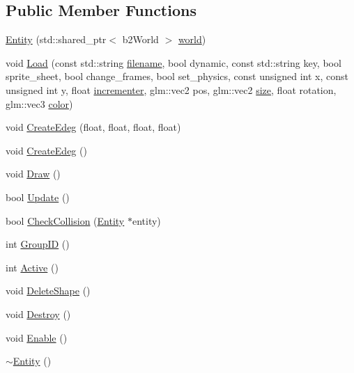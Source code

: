 \subsection*{Public Member Functions}
\begin{DoxyCompactItemize}
\item 
\hyperlink{classEntity_a921d3ec8d8b5f758f82af131847b6edb}{Entity} (std\+::shared\+\_\+ptr$<$ b2\+World $>$ \hyperlink{classEntity_a83af93b5af6170706ebedb406caae509}{world})
\item 
void \hyperlink{classEntity_a2102aef307a324ec71ab31de73e52ee9}{Load} (const std\+::string \hyperlink{classEntity_a6a4de89770f168dbe6134fec0c5f2ad1}{filename}, bool dynamic, const std\+::string key, bool sprite\+\_\+sheet, bool change\+\_\+frames, bool set\+\_\+physics, const unsigned int x, const unsigned int y, float \hyperlink{classEntity_a97cf0dd2b95f85c3f611c30f7a9fbf68}{incrementer}, glm\+::vec2 pos, glm\+::vec2 \hyperlink{classEntity_a4cac664de0560de978d85456f5426baa}{size}, float rotation, glm\+::vec3 \hyperlink{classEntity_a688dc0de5b453c60a542a4dbdf06322e}{color})
\item 
void \hyperlink{classEntity_a7fefffa6364b37cda22e713ab316fcc5}{Create\+Edeg} (float, float, float, float)
\item 
void \hyperlink{classEntity_af26655d5ca92e2a075940fc17fe68b1f}{Create\+Edeg} ()
\item 
void \hyperlink{classEntity_af0befbcbae6115851975d763e7dda312}{Draw} ()
\item 
bool \hyperlink{classEntity_a4417060da59c34999fe3f0b912cacd16}{Update} ()
\item 
bool \hyperlink{classEntity_a3c39519c4beb655b319767606413b7d6}{Check\+Collision} (\hyperlink{classEntity}{Entity} $\ast$entity)
\item 
int \hyperlink{classEntity_af4549ca1382aea2706101bc26b749d47}{Group\+ID} ()
\item 
int \hyperlink{classEntity_ae71d6f69f40deb56a6357bb4bf750091}{Active} ()
\item 
void \hyperlink{classEntity_a5910a6f56586f89d31b34f175ad29ea1}{Delete\+Shape} ()
\item 
void \hyperlink{classEntity_aa75151fc607686b42d27f8c3ba73143d}{Destroy} ()
\item 
void \hyperlink{classEntity_ad940b54ddb93e1b2cc72012589576478}{Enable} ()
\item 
\hyperlink{classEntity_adf6d3f7cb1b2ba029b6b048a395cc8ae}{$\sim$\+Entity} ()
\end{DoxyCompactItemize}
